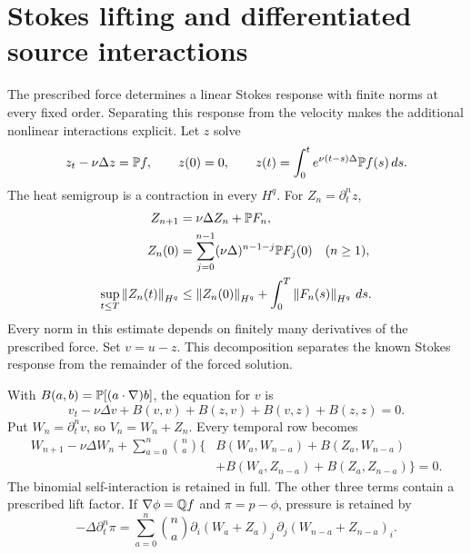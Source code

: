 \section{Stokes lifting and differentiated source interactions}\label{r:joined-sec:unrestricted}

The prescribed force determines a linear Stokes response with
finite norms at every fixed order. Separating this response from the
velocity makes the additional nonlinear interactions explicit.
Let $z$ solve
\begin{equation}\label{r:joined-eq:stokeslift}
z_t-\nu\Delta z=\mathbb P f,\qquad z(0)=0,
\qquad z(t)=\int_0^t e^{\nu(t-s)\Delta}\mathbb P f(s)\,ds.
\end{equation}
The heat semigroup is a contraction in every $H^q$. For $Z_n=\partial_t^nz$,
\begin{equation}\label{r:joined-eq:liftjets}
\begin{aligned}
Z_{n+1}&=\nu\Delta Z_n+\mathbb P F_n,\\
Z_n(0)&=\sum_{j=0}^{n-1}(\nu\Delta)^{n-1-j}\mathbb P F_j(0)
\quad(n\ge1),\\
\sup_{t\le T}\left\lVert Z_n(t)\right\rVert_{H^q}
&\le\left\lVert Z_n(0)\right\rVert_{H^q}+\int_0^T\left\lVert F_n(s)\right\rVert_{H^q}\,ds.
\end{aligned}
\end{equation}
Every norm in this estimate depends on finitely many derivatives of
the prescribed force. Set \(v=u-z\). This decomposition separates the
known Stokes response from the remainder of the forced solution.

With $B(a,b)=\mathbb P[(a\cdot\nabla)b]$, the equation for $v$ is
\begin{equation}\label{r:joined-eq:liftequation}
v_t-\nu\Delta v+B(v,v)+B(z,v)+B(v,z)+B(z,z)=0.
\end{equation}
Put $W_n=\partial_t^nv$, so $V_n=W_n+Z_n$. Every temporal row becomes
\begin{equation}\label{r:joined-eq:liftrow}
\begin{aligned}
W_{n+1}-\nu\Delta W_n
+\sum_{a=0}^n\binom na\bigl\{
&B(W_a,W_{n-a})+B(Z_a,W_{n-a})\\
&+B(W_a,Z_{n-a})+B(Z_a,Z_{n-a})\bigr\}=0.
\end{aligned}
\end{equation}
The binomial self-interaction is retained in full. The other three terms contain a prescribed lift factor. If $\nabla\phi=\mathbb Q f$ and $\pi=p-\phi$, pressure is retained by
\begin{equation}\label{r:joined-eq:liftpressure}
-\Delta\partial_t^n\pi
=\sum_{a=0}^n\binom na
\partial_i(W_a+Z_a)_j\,
\partial_j(W_{n-a}+Z_{n-a})_i.
\end{equation}

